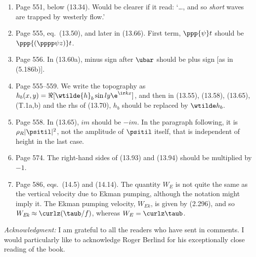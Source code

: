 \documentclass[10pt]{article}
\newcommand{\eq}{eq.\ } \newcommand{\Eq}{Eq.\ }
\begin{document}
\begin{enumerate}
\item Page 551, below (13.34). Would be clearer if it read: `\ldots, and so \emph{short} waves are trapped by westerly flow.'

\item Page 555, \eq (13.50), and later in (13.66). First term, $\ppp{\psi} t$ should be $\ppp{ (\pppp \psi z)} t$.  


\item Page 556. In  (13.60a), minus sign after $\ubar$ should be plus sign [as in (5.186b)].

\item Page 555--559. We write the topography as $h_b(x,y)= \Re [ \wtilde{h}_b \sin ly \e^{\ir kx} ]$, and then in (13.55), (13.58), (13.65), (T.1a,b) and the rhs of (13.70), $h_b$ should be replaced by $\wtilde h_b$.

\item Page 558. In (13.65), $im$ should be $-im$. In the paragraph following,
   it is $\rho_R |\psitil|^2$, not the amplitude of $\psitil$ itself, that is independent of height in the last case. 

\item Page 574. The right-hand sides of (13.93) and (13.94) should be multiplied by $-1$.

\item Page 586, eqs.\ (14.5) and (14.14). The quantity $W_E$ is not quite the same as the vertical velocity due to Ekman pumping, although the notation might imply it. The Ekman pumping velocity, $W_{\textit{Ek}}$, is given by (2.296), and so $W_{\textit{Ek}} \approx \curlz (\taub/f)$, whereas $W_E = \curlz \taub$.  
 


\end{enumerate}

\noindent \textit{Acknowledgment:} I am grateful to all the readers who have sent in comments. I would particularly like to acknowledge Roger Berlind for his exceptionally close reading of the book.
\end{document}
